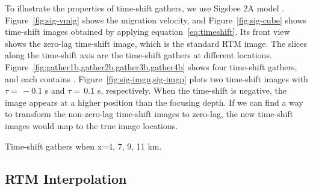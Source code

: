 To illustrate the properties of time-shift gathers, we use Sigsbee 2A model .
Figure~\ref{fig:sig-vmig} shows the migration velocity, and
Figure~\ref{fig:sig-cube} shows time-shift images obtained by applying equation~\ref{eq:timeshift}.
Its front view shows the zero-lag time-shift image, which is the standard RTM image.
The slices along the time-shift axis are the time-shift gathers at different locations.
Figure~\ref{fig:gather1b,gather2b,gather3b,gather4b} shows four time-shift gathers, 
and each contains  .
Figure~\ref{fig:sig-imgn,sig-imgp} plots two time-shift images with $\tau= \, -0.1$ s and $\tau= \, 0.1$ s, respectively.
When the time-shift is negative, the image appears at a higher position than the focusing depth.
If we can find a way to transform the non-zero-lag time-shift images to zero-lag, the new time-shift images would map to the true image locations.

{Time-shift gathers when x=4, 7, 9, 11 km.}

\subsection{RTM Interpolation}

